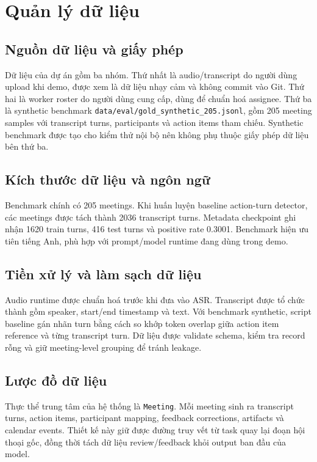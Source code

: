 \chapter{Quản lý dữ liệu}

\section{Nguồn dữ liệu và giấy phép}

Dữ liệu của dự án gồm ba nhóm. Thứ nhất là audio/transcript do người dùng upload khi demo, được xem là dữ liệu nhạy cảm và không commit vào Git. Thứ hai là worker roster do người dùng cung cấp, dùng để chuẩn hoá assignee. Thứ ba là synthetic benchmark \texttt{data/eval/gold\_synthetic\_205.jsonl}, gồm 205 meeting samples với transcript turns, participants và action items tham chiếu. Synthetic benchmark được tạo cho kiểm thử nội bộ nên không phụ thuộc giấy phép dữ liệu bên thứ ba.

\section{Kích thước dữ liệu và ngôn ngữ}

Benchmark chính có 205 meetings. Khi huấn luyện baseline action-turn detector, các meetings được tách thành 2036 transcript turns. Metadata checkpoint ghi nhận 1620 train turns, 416 test turns và positive rate 0.3001. Benchmark hiện ưu tiên tiếng Anh, phù hợp với prompt/model runtime đang dùng trong demo.

\section{Tiền xử lý và làm sạch dữ liệu}

Audio runtime được chuẩn hoá trước khi đưa vào ASR. Transcript được tổ chức thành  gồm speaker, start/end timestamp và text. Với benchmark synthetic, script baseline gán nhãn turn bằng cách so khớp token overlap giữa action item reference và từng transcript turn. Dữ liệu được validate schema, kiểm tra record rỗng và giữ meeting-level grouping để tránh leakage.

\section{Lược đồ dữ liệu}

Thực thể trung tâm của hệ thống là \texttt{Meeting}. Mỗi meeting sinh ra transcript turns, action items, participant mapping, feedback corrections, artifacts và calendar events. Thiết kế này giữ được đường truy vết từ task quay lại đoạn hội thoại gốc, đồng thời tách dữ liệu review/feedback khỏi output ban đầu của model.

